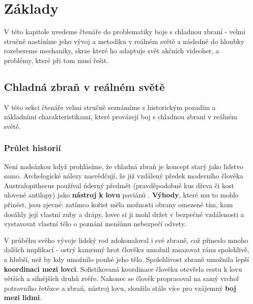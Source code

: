 \chapter{Základy}
V této kapitole uvedeme čtenáře do problematiky boje s chladnou zbraní - velmi stručně nastíníme jeho vývoj a metodiku v reálném světě a následně do hloubky rozebereme mechaniky, skrze které ho adaptuje svět akčních videoher, a problémy, které při tom musí řešit.


\section{Chladná zbraň v reálném světě}
V této sekci čtenáře velmi stručně seznámíme s historickým pozadím a základními charakteristikami, které provázejí boj s chladnou zbraní v reálném světě.

\subsection{Průlet historií}

Není nadsázkou když prohlásíme, že chladná zbraň je koncept starý jako lidstvo samo. Archelogické nálezy nasvědčují, že již vzdálený předek moderního člověka Australopithecus používal úderný předmět (pravděpodobně kus dřeva či kost ulovené antilopy) jako \textbf{nástroj k lovu} paviánů \cite{AustralopithecusWeapon}. \textbf{Výhody}, které mu to mohlo přinést, jsou zjevné: zatímco kořist měla možnosti obrany omezené tím, kam dosáhly její vlastní zuby a drápy, lovec si ji mohl držet v bezpečné vzdálenosti a vystavovat vlastní tělo o poznání menšímu nebezpečí odvety.

V průběhu svého vývoje lidský rod zdokonaloval i své zbraně, což přineslo mnoho dalších implikací - ostrý kamenný hrot člověku umožnil zasazovat ránu spolehlivě, a hlubší, než by kdy umožnilo pouhé jeho tělo. Spolehlivost zbraně umožnila lepší \textbf{koordinaci mezi lovci}. Sofistikovaná koordinace člověku otevřela cestu k lovu větších a silnějších druhů zvěře. Nakonec se člověk propracoval na samý vrchol potravního řetězce a zbraň, nástroj lovu, sloužila stále více pro vzájemný \textbf{boj mezi lidmi}. 

